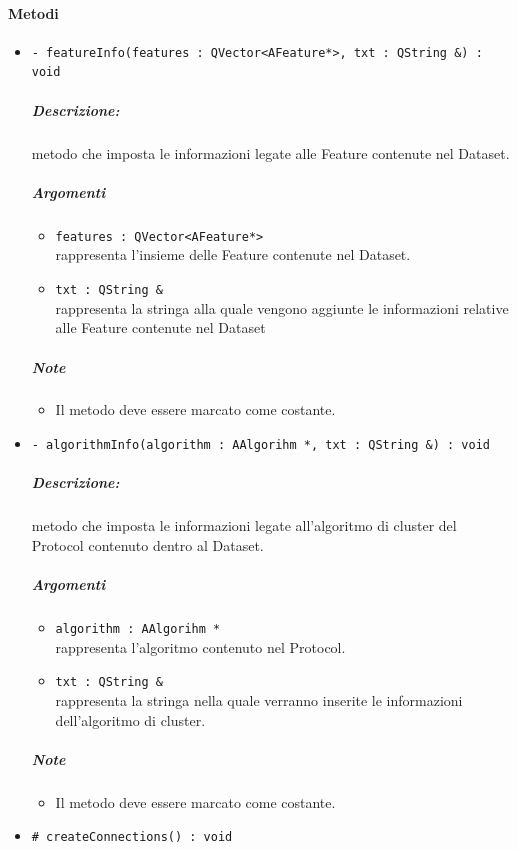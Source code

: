 	\paragraph{\color{black}Metodi}
		\begin{itemize}
			\item \color{blue} \verb!- featureInfo(features : QVector<AFeature*>, txt : QString &) : void!
			\color{black}
			\subparagraph{Descrizione:} metodo che imposta le informazioni legate alle Feature\g{} contenute nel Dataset\g{}.
			\color{black}
			\subparagraph{Argomenti}
			\begin{itemize}
				\item \color{RoyalPurple} \verb!features : QVector<AFeature*>!\\				
\color{black} rappresenta l'insieme delle Feature\g{} contenute nel Dataset\g{}.
				\item \color{RoyalPurple} \verb!txt : QString &!\\				
\color{black} rappresenta la stringa alla quale vengono aggiunte le informazioni relative alle Feature\g{} contenute nel Dataset\g{}
			\end{itemize}
			\subparagraph{Note}
			\begin{itemize}
				\item Il metodo deve essere marcato come costante.
			\end{itemize}
			\item \color{blue} \verb!- algorithmInfo(algorithm : AAlgorihm *, txt : QString &) : void!
			\color{black}
			\subparagraph{Descrizione:} metodo che imposta le informazioni legate all'algoritmo di cluster\g{}  del Protocol\g{} contenuto dentro al Dataset\g{}.
			\color{black}
			\subparagraph{Argomenti}
			\begin{itemize}
				\item \color{RoyalPurple} \verb!algorithm : AAlgorihm *!\\				
\color{black} rappresenta l'algoritmo contenuto nel Protocol\g{}.
				\item \color{RoyalPurple} \verb!txt : QString &!\\				
\color{black} rappresenta la stringa nella quale verranno inserite le informazioni dell'algoritmo di cluster\g{}.
			\end{itemize}
			\subparagraph{Note}
			\begin{itemize}
				\item Il metodo deve essere marcato come costante.
			\end{itemize}
			\item \color{blue} \verb!# createConnections() : void!

\end{itemize}
